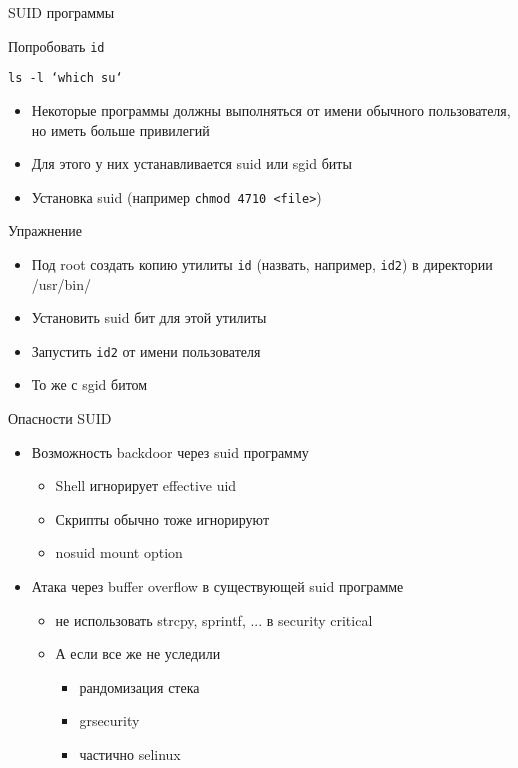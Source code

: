 \begin{frame}{SUID программы}
	\begin{block}{Попробовать}
		{\tt id}

		{\tt ls -l `which su`}
	\end{block}
	\pause
	\begin{itemize}
		\item Некоторые программы должны выполняться от имени обычного пользователя, но иметь больше привилегий
		\item Для этого у них устанавливается suid или sgid биты
		\item Установка suid (например {\tt chmod 4710 <file>})
	\end{itemize}
	\pause
	\begin{block}{Упражнение}
		\begin{itemize}
			\item Под root создать копию утилиты {\tt id} (назвать, например, {\tt id2}) в директории /usr/bin/
			\item Установить suid бит для этой утилиты
			\item Запустить {\tt id2} от имени пользователя 
			\item То же с sgid битом
		\end{itemize}
	\end{block}
\end{frame}

\begin{frame}{Опасности SUID}
	\begin{itemize}
		\item Возможность backdoor через suid программу
			\begin{itemize}
				\item Shell игнорирует effective uid
				\item Скрипты обычно тоже игнорируют
				\item nosuid mount option
			\end{itemize}
		\item Атака через buffer overflow в существующей suid программе
			\begin{itemize}
				\item не использовать strcpy, sprintf, ... в security critical
				\item А если все же не уследили
					\begin{itemize}
						\item рандомизация стека
						\item grsecurity
						\item частично selinux
					\end{itemize}
			\end{itemize}
	\end{itemize}
\end{frame}


